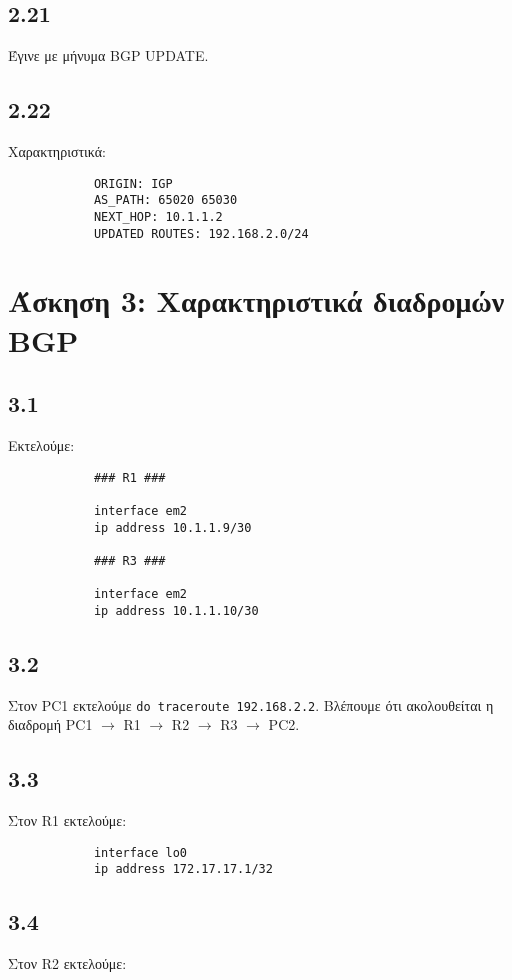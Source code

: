 \documentclass[a4paper, 12pt]{article}
\begin{document}
	\subsection*{2.21}
		Έγινε με μήνυμα BGP UPDATE.

	\subsection*{2.22} 
		Χαρακτηριστικά:
		
		\begin{verbatim}
			ORIGIN: IGP
			AS_PATH: 65020 65030
			NEXT_HOP: 10.1.1.2
			UPDATED ROUTES: 192.168.2.0/24 
		\end{verbatim}
		

\section*{Άσκηση 3: Χαρακτηριστικά διαδρομών BGP}

	\subsection*{3.1}
		Εκτελούμε:
		
		\begin{verbatim}
			### R1 ###
			
			interface em2 
			ip address 10.1.1.9/30
			
			### R3 ###
			
			interface em2
			ip address 10.1.1.10/30
		\end{verbatim}

	\subsection*{3.2}
		Στον PC1 εκτελούμε \verb|do traceroute 192.168.2.2|. Βλέπουμε ότι ακολουθείται η διαδρομή PC1 $\rightarrow$ R1 $\rightarrow$ R2 $\rightarrow$ R3 $\rightarrow$ PC2.

	\subsection*{3.3}
		Στον R1 εκτελούμε:
		
		\begin{verbatim}
			interface lo0
			ip address 172.17.17.1/32
		\end{verbatim}

	\subsection*{3.4}
		Στον R2 εκτελούμε:
		
\end{document}
